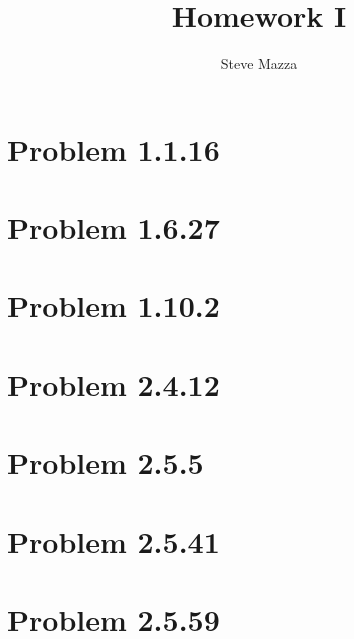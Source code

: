 \documentclass[letterpaper,10pt]{article}
\title{Homework I}
\author{Steve Mazza}
\begin{document}
\maketitle

\section*{Problem 1.1.16}

\section*{Problem 1.6.27}

\section*{Problem 1.10.2}

\section*{Problem 2.4.12}

\section*{Problem 2.5.5}

\section*{Problem 2.5.41}

\section*{Problem 2.5.59}
\end{document}
